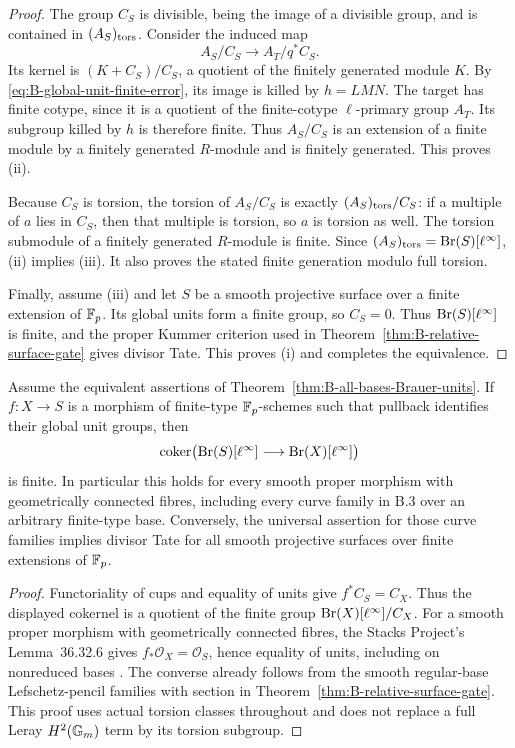 \begin{proof}
The group \(C_S\) is divisible, being the image of a
divisible group, and is contained in \((A_S)_{\rm tors}\).
Consider the induced map
\[
       A_S/C_S\longrightarrow A_T/q^*C_S.
\]
Its kernel is \((K+C_S)/C_S\), a quotient of the
finitely generated module \(K\).  By
\eqref{eq:B-global-unit-finite-error}, its image is killed
by \(h=LMN\).  The target has finite cotype, since it is
a quotient of the finite-cotype \(\ell\)-primary group
\(A_T\).  Its subgroup killed by \(h\) is therefore
finite.  Thus \(A_S/C_S\) is an extension of a finite
module by a finitely generated \(R\)-module and is
finitely generated.  This proves (ii).

Because \(C_S\) is torsion, the torsion of \(A_S/C_S\)
is exactly \((A_S)_{\rm tors}/C_S\): if a multiple of
\(a\) lies in \(C_S\), then that multiple is torsion,
so \(a\) is torsion as well.  The torsion submodule of
a finitely generated \(R\)-module is finite.  Since
\((A_S)_{\rm tors}=\operatorname{Br}(S)[\ell^\infty]\), (ii)
implies (iii).  It also proves the stated finite generation
modulo full torsion.

Finally, assume (iii) and let \(S\) be a smooth projective
surface over a finite extension of \(\mathbb F_p\).
Its global units form a finite group, so \(C_S=0\).
Thus \(\operatorname{Br}(S)[\ell^\infty]\) is finite, and the
proper Kummer criterion used in
Theorem~\ref{thm:B-relative-surface-gate} gives divisor Tate.
This proves (i) and completes the equivalence.
\end{proof}

\begin{corollary}
\label{cor:B-all-bases-relative-Brauer}
Assume the equivalent assertions of
Theorem~\ref{thm:B-all-bases-Brauer-units}.
If \(f:X\to S\) is a morphism of finite-type
\(\mathbb F_p\)-schemes such that pullback identifies their
global unit groups, then
\[
 \operatorname{coker}\bigl(
       \operatorname{Br}(S)[\ell^\infty]\longrightarrow
       \operatorname{Br}(X)[\ell^\infty]\bigr)
\]
is finite.  In particular this holds for every smooth proper
morphism with geometrically connected fibres, including every
curve family in B.3 over an arbitrary finite-type base.
Conversely, the universal assertion for those curve families
implies divisor Tate for all smooth projective surfaces over
finite extensions of \(\mathbb F_p\).
\end{corollary}
\begin{proof}
Functoriality of cups and equality of units give
\(f^*C_S=C_X\).  Thus the displayed cokernel is a
quotient of the finite group
\(\operatorname{Br}(X)[\ell^\infty]/C_X\).
For a smooth proper morphism with geometrically connected
fibres, the Stacks Project's Lemma~36.32.6 gives
\(f_*\mathcal O_X=\mathcal O_S\), hence equality of
units, including on nonreduced bases
\cite[Lemma~36.32.6, tag 0E0L]{BStacksConnectedUnits}.
The converse already
follows from the smooth regular-base Lefschetz-pencil
families with section in
Theorem~\ref{thm:B-relative-surface-gate}.
This proof uses actual torsion classes throughout and does
not replace a full Leray \(H^2({\mathbb G_m})\) term by its
torsion subgroup.
\end{proof}
